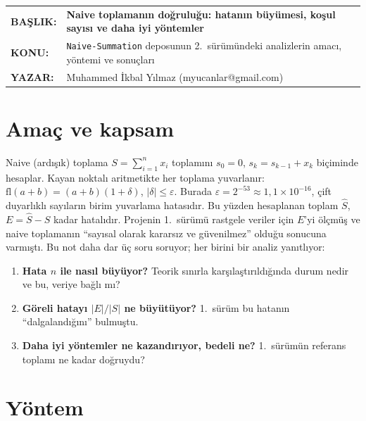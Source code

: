 \documentclass[11pt,a4paper]{article}
\begin{document}
\vspace*{14pt}
\begin{tabular}{@{}p{2.35cm}@{}p{\dimexpr\textwidth-2.35cm}@{}}
\textbf{BAŞLIK:} & \textbf{\large Naive toplamanın doğruluğu: hatanın büyümesi, koşul sayısı ve daha iyi yöntemler}\\[3pt]
\textbf{KONU:} & \texttt{Naive-Summation} deposunun 2.\ sürümündeki analizlerin amacı, yöntemi ve sonuçları\\[3pt]
\textbf{YAZAR:} & Muhammed İkbal Yılmaz (myucanlar@gmail.com)
\end{tabular}

\vspace{8pt}
\vspace{12pt}

\section{Amaç ve kapsam}

Naive (ardışık) toplama $S = \sum_{i=1}^{n} x_i$ toplamını $s_0 = 0$, $s_k = s_{k-1} + x_k$ biçiminde hesaplar. Kayan noktalı
aritmetikte her toplama yuvarlanır: $\mathrm{fl}(a+b) = (a+b)(1+\delta)$, $|\delta| \le \varepsilon$. Burada
$\varepsilon = 2^{-53} \approx 1{,}1\times10^{-16}$, çift duyarlıklı sayıların birim yuvarlama hatasıdır. Bu yüzden hesaplanan
toplam $\hat S$, $E = \hat S - S$ kadar hatalıdır. Projenin 1.\ sürümü rastgele veriler için $E$'yi ölçmüş ve naive toplamanın
``sayısal olarak kararsız ve güvenilmez'' olduğu sonucuna varmıştı. Bu not daha dar üç soru soruyor; her birini bir analiz
yanıtlıyor:

\begin{enumerate}
  \item \textbf{Hata $n$ ile nasıl büyüyor?} Teorik sınırla karşılaştırıldığında durum nedir ve bu, veriye bağlı mı?
  \item \textbf{Göreli hatayı $|E|/|S|$ ne büyütüyor?} 1.\ sürüm bu hatanın ``dalgalandığını'' bulmuştu.
  \item \textbf{Daha iyi yöntemler ne kazandırıyor, bedeli ne?} 1.\ sürümün referans toplamı ne kadar doğruydu?
\end{enumerate}

\section{Yöntem}
\end{document}
